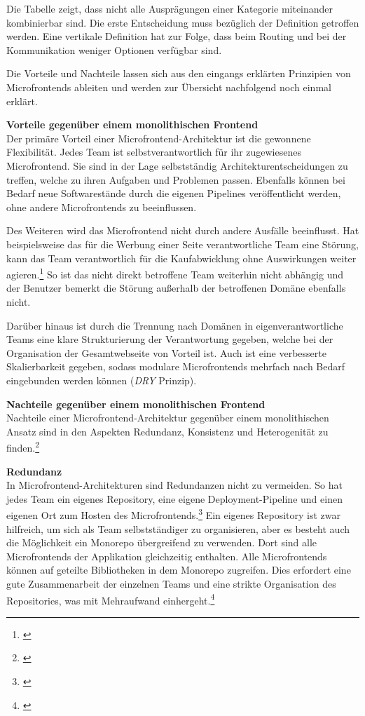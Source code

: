 Die Tabelle zeigt, dass nicht alle Ausprägungen einer Kategorie miteinander kombinierbar sind. Die erste Entscheidung muss bezüglich der Definition getroffen werden. Eine vertikale Definition hat zur Folge, dass beim Routing und bei der Kommunikation weniger Optionen verfügbar sind.

Die Vorteile und Nachteile lassen sich aus den eingangs erklärten Prinzipien von Microfrontends ableiten und werden zur Übersicht nachfolgend noch einmal erklärt.

\textbf{Vorteile gegenüber einem monolithischen Frontend}\\
Der primäre Vorteil einer Microfrontend-Architektur ist die gewonnene Flexibilität. Jedes Team ist selbstverantwortlich für ihr zugewiesenes Microfrontend. Sie sind in der Lage selbstständig Architekturentscheidungen zu treffen, welche zu ihren Aufgaben und Problemen passen. Ebenfalls können bei Bedarf neue Softwarestände durch die eigenen Pipelines veröffentlicht werden, ohne andere Microfrontends zu beeinflussen. 

Des Weiteren wird das Microfrontend nicht durch andere Ausfälle beeinflusst. Hat beispielsweise das für die Werbung einer Seite verantwortliche Team eine Störung, kann das Team verantwortlich für die Kaufabwicklung ohne Auswirkungen weiter agieren.\footnote{\cite[vgl.][19\psq]{Mezzalira2021}} So ist das nicht direkt betroffene Team weiterhin nicht abhängig und der Benutzer bemerkt die Störung außerhalb der betroffenen Domäne ebenfalls nicht.

Darüber hinaus ist durch die Trennung nach Domänen in eigenverantwortliche Teams eine klare Strukturierung der Verantwortung gegeben, welche bei der Organisation der Gesamtwebseite von Vorteil ist. Auch ist eine verbesserte Skalierbarkeit gegeben, sodass modulare Microfrontends mehrfach nach Bedarf eingebunden werden können (\textit{\gls{DRY}} Prinzip).

\textbf{Nachteile gegenüber einem monolithischen Frontend}\\
Nachteile einer Microfrontend-Architektur gegenüber einem monolithischen Ansatz sind in den Aspekten Redundanz, Konsistenz und Heterogenität zu finden.\footnote{\cite[vgl.][17]{Geers2020}}

\textbf{Redundanz}\\
In Microfrontend-Architekturen sind Redundanzen nicht zu vermeiden. So hat jedes Team ein eigenes Repository, eine eigene Deployment-Pipeline und einen eigenen Ort zum Hosten des Microfrontends.\footnote{\cite[vgl.][17\psq]{Geers2020}} Ein eigenes Repository ist zwar hilfreich, um sich als Team selbstständiger zu organisieren, aber es besteht auch die Möglichkeit ein Monorepo übergreifend zu verwenden. Dort sind alle Microfrontends der Applikation gleichzeitig enthalten. Alle Microfrontends können auf geteilte Bibliotheken in dem Monorepo zugreifen. Dies erfordert eine gute Zusammenarbeit der einzelnen Teams und eine strikte Organisation des Repositories, was mit Mehraufwand einhergeht.\footnote{\cite[vgl.][153\psq]{Mezzalira2021}}

